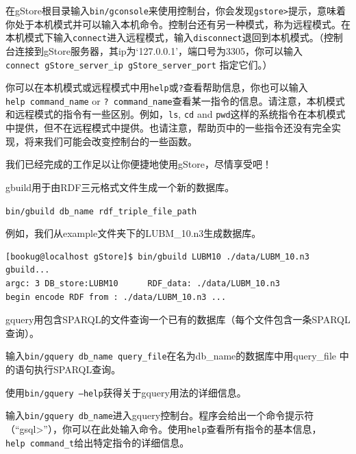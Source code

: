 \documentclass[titlepage, a4paper, 12pt]{article}
\begin{document}
在gStore根目录输入\texttt{bin/gconsole}来使用控制台，你会发现\texttt{gstore\textgreater{}}提示，意味着你处于本机模式并可以输入本机命令。控制台还有另一种模式，称为远程模式。在本机模式下输入\texttt{connect}进入远程模式，输入\texttt{disconnect}退回到本机模式。（控制台连接到gStore服务器，其ip为`127.0.0.1'，端口号为3305，你可以输入\texttt{connect\ gStore\_server\_ip\ gStore\_server\_port} 指定它们。）

你可以在本机模式或远程模式中用\texttt{help}或\texttt{?}查看帮助信息，你也可以输入\texttt{help\ command\_name} or \texttt{?\ command\_name}查看某一指令的信息。请注意，本机模式和远程模式的指令有一些区别。例如，\texttt{ls}, \texttt{cd} and \texttt{pwd}这样的系统指令在本机模式中提供，但不在远程模式中提供。也请注意，帮助页中的一些指令还没有完全实现，将来我们可能会改变控制台的一些函数。

我们已经完成的工作足以让你便捷地使用gStore，尽情享受吧！


gbuild用于由RDF三元格式文件生成一个新的数据库。

\texttt{bin/gbuild\ db\_name\ rdf\_triple\_file\_path}

例如，我们从example文件夹下的LUBM\_10.n3生成数据库。

\begin{verbatim}
[bookug@localhost gStore]$ bin/gbuild LUBM10 ./data/LUBM_10.n3
gbuild...
argc: 3 DB_store:LUBM10      RDF_data: ./data/LUBM_10.n3
begin encode RDF from : ./data/LUBM_10.n3 ...
\end{verbatim}


gquery用包含SPARQL的文件查询一个已有的数据库（每个文件包含一条SPARQL查询）。

输入\texttt{bin/gquery\ db\_name\ query\_file}在名为db\_name的数据库中用query\_file 中的语句执行SPARQL查询。

使用\texttt{bin/gquery\ --help}获得关于gquery用法的详细信息。

输入\texttt{bin/gquery\ db\_name}进入gquery控制台。程序会给出一个命令提示符（“gsql\textgreater{}”），你可以在此处输入命令。使用\texttt{help}查看所有指令的基本信息，\texttt{help\ command\_t}给出特定指令的详细信息。
\end{document}
